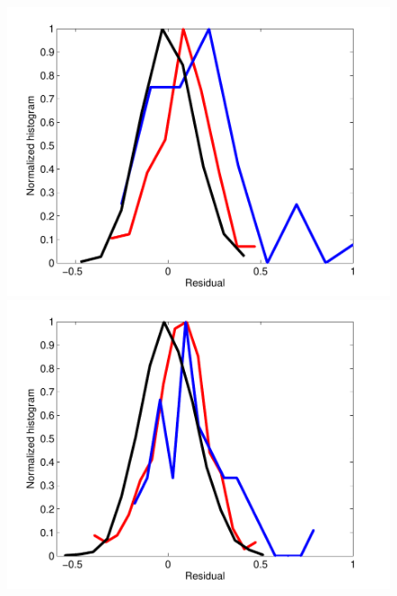 \begin{figure}[h]
\centering
\begin{minipage}[c]{0.30\hsize}
\includegraphics[width=\hsize]{../figs/Figure10a_residuals_iidglm}
\end{minipage}
\begin{minipage}[c]{0.30\hsize}
\includegraphics[width=\hsize]{../figs/Figure10b_residuals_baseglm}
\end{minipage}
\begin{minipage}[c]{0.30\hsize}

\end{minipage}
\end{figure}
